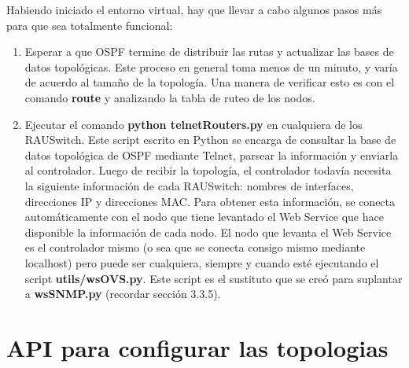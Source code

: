 Habiendo iniciado el entorno virtual, hay que llevar a cabo algunos pasos más para que sea totalmente funcional:
\begin{enumerate}
	\item Esperar a que OSPF termine de distribuir las rutas y actualizar las bases de datos topológicas. Este proceso en general toma menos de un minuto, y varía de acuerdo al tamaño de la topología. Una manera de verificar esto es con el comando \textbf{route} y analizando la tabla de ruteo de los nodos.
	\item Ejecutar el comando \textbf{python telnetRouters.py} en cualquiera de los RAUSwitch. Este script escrito en Python se encarga de consultar la base de datos topológica de OSPF mediante Telnet, parsear la información y enviarla al controlador. Luego de recibir la topología, el controlador todavía necesita la siguiente información de cada RAUSwitch: nombres de interfaces, direcciones IP y direcciones MAC. Para obtener esta información, se conecta automáticamente con el nodo que tiene levantado el Web Service que hace disponible la información de cada nodo. El nodo que levanta el Web Service es el controlador mismo (o sea que se conecta consigo mismo mediante localhost) pero puede ser cualquiera, siempre y cuando esté ejecutando el script \textbf{utils/wsOVS.py}. Este script es el sustituto que se creó para suplantar a \textbf{wsSNMP.py} (recordar sección 3.3.5).
\end{enumerate}

\section{API para configurar las topologias}



